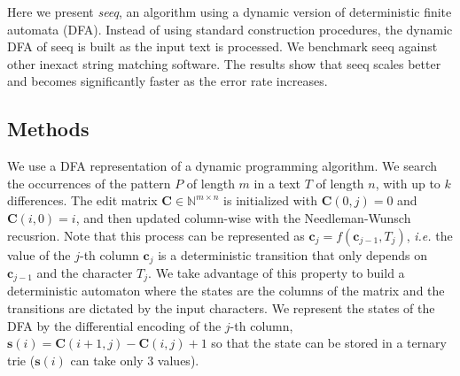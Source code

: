 \documentclass{bioinfo}
\begin{document}
Here we present \emph{seeq}, an algorithm using a dynamic version of
deterministic finite automata (DFA). Instead of using standard
construction procedures, the dynamic DFA of seeq is built as the input
text is processed. We benchmark seeq against other inexact string
matching software. The results show that seeq scales better and
becomes significantly faster as the error rate increases. 
\begin{methods}
\section{Methods}

We use a DFA representation of a dynamic programming algorithm.
We search the occurrences of the pattern $P$ of length $m$
in a text $T$ of length $n$, with up to $k$ differences.
The edit matrix $\mathbf{C} \in \mathbb{N}^{m\times n}$ is initialized
with $\mathbf{C}(0,j)=0$ and $\mathbf{C}(i,0) = i$, and then updated
column-wise with the Needleman-Wunsch recusrion. Note that this process
can be represented as $\mathbf{c}_j=f(\mathbf{c}_{j-1},T_j)$,
\textit{i.e.} the value of the $j$-th column $\mathbf{c}_{j}$ is a
deterministic transition that only depends on $\mathbf{c}_{j-1}$ and the
character $T_j$. We take advantage of this property to build a
deterministic automaton where the states are the columns of the matrix
and the transitions are dictated by the input characters.
We represent the states of the DFA by the differential encoding
of the $j$-th column, $\mathbf{s}(i)=\mathbf{C}(i+1,j)-\mathbf{C}(i,j)+1$
so that the state can be stored in a ternary trie ($\mathbf{s}(i)$
can take only 3 values).


\end{methods}
\end{document}
